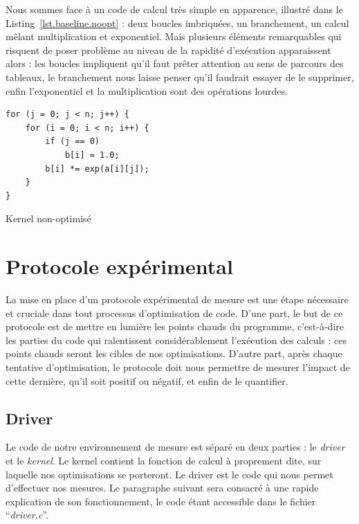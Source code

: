 \documentclass[12pt,a4paper]{article}
\begin{document}
Nous sommes face à un code de calcul très simple en apparence, illustré dans le
Listing~\ref{lst.baseline.noopt} : deux boucles imbriquées, un branchement, un
calcul mêlant multiplication et exponentiel. Mais plusieurs éléments remarquables qui
risquent de poser problème au niveau de la rapidité d'exécution apparaissent
alors : les boucles impliquent qu'il faut prêter attention au sens de parcours
des tableaux, le branchement nous laisse penser qu'il faudrait essayer de le
supprimer, enfin l'exponentiel et la multiplication sont des opérations lourdes.

\begin{listing}[ht]
    \begin{verbatim}
for (j = 0; j < n; j++) {
    for (i = 0; i < n; i++) {
        if (j == 0)
            b[i] = 1.0;
        b[i] *= exp(a[i][j]);
    }
}
    \end{verbatim}
    \caption{Kernel non-optimisé}
    \label{lst.baseline.noopt}
\end{listing}

\section{Protocole expérimental}

La mise en place d'un protocole expérimental de mesure est une étape nécessaire
et cruciale dans tout processus d'optimisation de code. D'une part, le but de ce
protocole est de mettre en lumière les points chauds du programme, c'est-à-dire
les parties du code qui ralentissent considérablement l'exécution des calculs :
ces points chauds seront les cibles de nos optimisations. D'autre part, après
chaque tentative d'optimisation, le protocole doit nous permettre de mesurer
l'impact de cette dernière, qu'il soit positif ou négatif, et enfin de le
quantifier.

\subsection{Driver}

Le code de notre environnement de mesure est séparé en deux parties : le \textit{driver}
et le \textit{kernel}. Le kernel contient la fonction de calcul à proprement
dite, sur laquelle nos optimisations se porteront. Le driver est le code qui
nous permet d'effectuer nos mesures. Le paragraphe suivant sera consacré à une
rapide explication de son fonctionnement, le code étant accessible dans le fichier
\enquote{\textit{driver.c}}.
\end{document}

